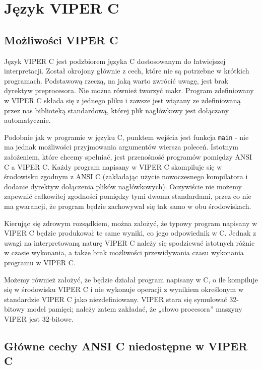 \documentclass[a4paper,twoside,openright,11pt]{report}
\begin{document}
  \chapter {Język VIPER C}

  \section {Możliwości VIPER C}

\par Język VIPER C jest podzbiorem języka C dostosowanym do łatwiejszej interpretacji. Został okrojony głównie z cech, które nie są potrzebne w krótkich programach. Podstawową rzeczą, na jaką warto zwrócić uwagę, jest brak dyrektyw preprocesora. Nie można również tworzyć makr. Program zdefiniowany w VIPER C składa się z jednego pliku i zawsze jest wiązany ze zdefiniowaną przez nas biblioteką standardową, której plik nagłówkowy jest dołączany automatycznie. 
\par Podobnie jak w programie w języku C, punktem wejścia jest funkcja \texttt{main} - nie ma jednak możliwości przyjmowania argumentów wiersza poleceń. Istotnym założeniem, które chcemy spełniać, jest przenośność programów pomiędzy ANSI C a VIPER C. Każdy program napisany w VIPER C skompiluje się w środowisku zgodnym z ANSI C (zakładając użycie nowoczesnego kompilatora i dodanie dyrektyw dołączenia plików nagłówkowych). Oczywiście nie możemy zapewnić całkowitej zgodności pomiędzy tymi dwoma standardami, przez co nie ma gwarancji, że program będzie zachowywał się tak samo w obu środowiskach. \par Kierując się zdrowym rozsądkiem, można założyć, że typowy program napisany w VIPER C będzie produkował te same wyniki, co jego odpowiednik w C. Jednak z uwagi na interpretowaną naturę VIPER C należy się spodziewać istotnych różnic w czasie wykonania, a także brak możliwości przewidywania czasu wykonania programu w VIPER C. 
\par Możemy również założyć, że będzie działał program napisany w C, o ile kompiluje się w środowisku VIPER C i nie wykonuje operacji z wynikiem określonym w standardzie VIPER C jako niezdefiniowany. VIPER stara się symulować 32-bitowy model pamięci; należy zatem zakładać, że „słowo procesora” maszyny VIPER jest 32-bitowe. 

  \section {Główne cechy ANSI C niedostępne w VIPER C}
\end{document}
